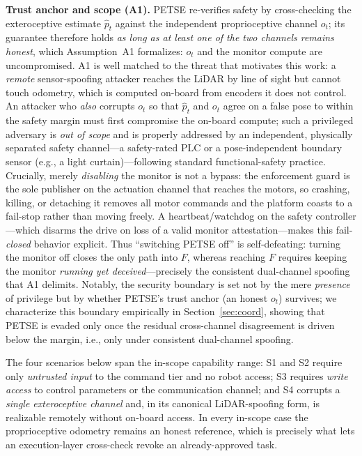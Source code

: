 \documentclass[conference]{IEEEtran}
\begin{document}
\textbf{Trust anchor and scope (A1).} PETSE re-verifies safety by
cross-checking the exteroceptive estimate $\hat{p}_t$ against the
independent proprioceptive channel $o_t$; its guarantee therefore holds
\emph{as long as at least one of the two channels remains honest}, which
Assumption~A1 formalizes: $o_t$ and the monitor compute are
uncompromised. A1 is well matched to the threat that motivates this
work: a \emph{remote} sensor-spoofing attacker reaches the LiDAR by line
of sight but cannot touch odometry, which is computed on-board from
encoders it does not control. An attacker who \emph{also} corrupts $o_t$
so that $\hat{p}_t$ and $o_t$ agree on a false pose to within the safety
margin must first compromise the on-board compute; such a privileged
adversary is \emph{out of scope} and is properly addressed by an
independent, physically separated safety channel---a safety-rated PLC or
a pose-independent boundary sensor (e.g., a light curtain)---following
standard functional-safety practice. Crucially, merely \emph{disabling}
the monitor is not a bypass: the enforcement guard is the sole publisher
on the actuation channel that reaches the motors, so crashing, killing, or
detaching it removes all motor commands and the platform coasts to a
fail-stop rather than moving freely. A heartbeat/watchdog on the safety
controller---which disarms the drive on loss of a valid monitor
attestation---makes this fail-\emph{closed} behavior explicit. Thus
``switching PETSE off'' is self-defeating: turning the monitor off closes
the only path into $F$, whereas reaching $F$ requires keeping the monitor
\emph{running yet deceived}---precisely the consistent dual-channel
spoofing that A1 delimits. Notably, the security boundary is
set not by the mere \emph{presence} of privilege but by whether PETSE's
trust anchor (an honest $o_t$) survives; we characterize this boundary
empirically in Section~\ref{sec:coord}, showing that PETSE is evaded only
once the residual cross-channel disagreement is driven below the margin,
i.e., only under consistent dual-channel spoofing.

The four scenarios below span the in-scope capability range: S1 and S2
require only \emph{untrusted input} to the command tier and no robot
access; S3 requires \emph{write access} to control parameters or the
communication channel; and S4 corrupts a \emph{single exteroceptive
channel} and, in its canonical LiDAR-spoofing form, is realizable
remotely without on-board access. In every in-scope case the
proprioceptive odometry remains an honest reference, which is precisely
what lets an execution-layer cross-check revoke an already-approved task.
\end{document}
